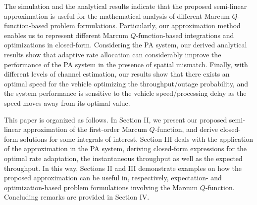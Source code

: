 The simulation and the analytical results indicate that the proposed semi-linear approximation is useful for the mathematical analysis of different Marcum $Q$-function-based problem formulations. Particularly, our approximation method enables us to represent different Marcum $Q$-function-based integrations and optimizations in closed-form. Considering the PA system, our derived analytical results show that adaptive rate allocation can considerably improve the performance of the PA system in the presence of spatial mismatch. Finally, with different levels of channel estimation, our results show that there exists an optimal speed for the vehicle optimizing the throughput/outage probability, and the system performance is sensitive to the vehicle speed/processing delay as the speed moves away from its optimal value. 


This paper is organized as follows. In Section II, we present our proposed semi-linear approximation of the first-order Marcum $Q$-function, and derive closed-form solutions for some integrals of interest. Section III deals with the application of the approximation in the PA system,  deriving closed-form expressions for the optimal rate adaptation, the instantaneous throughput as well as the expected throughput.  In this way, Sections II and III demonstrate examples on how the proposed approximation can be useful in, respectively, expectation- and optimization-based problem formulations involving the Marcum $Q$-function. Concluding remarks are provided in Section IV. 





